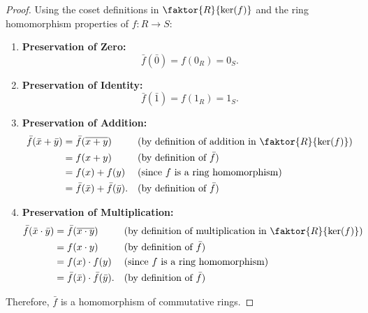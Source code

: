 \begin{proofWrapper}
\begin{content}
\begin{proof}
Using the coset definitions in $\faktor{R}{\ker(f)}$ and the ring homomorphism properties of $f \colon R \to S$:
\begin{enumerate}[label=\textbf{(\arabic*)}]
    \item \textbf{Preservation of Zero:}
    \[
    \bar{f}(\bar{0}) = f(0_R) = 0_S.
    \]
    \item \textbf{Preservation of Identity:}
    \[
    \bar{f}(\bar{1}) = f(1_R) = 1_S.
    \]
    \item \textbf{Preservation of Addition:}
    \begin{align*}
    \bar{f}(\bar{x} + \bar{y}) &= \bar{f}(\overline{x + y}) && \text{(by definition of addition in $\faktor{R}{\ker(f)}$)} \\
    &= f(x + y) && \text{(by definition of $\bar{f}$)} \\
    &= f(x) + f(y) && \text{(since $f$ is a ring homomorphism)} \\
    &= \bar{f}(\bar{x}) + \bar{f}(\bar{y}). && \text{(by definition of $\bar{f}$)}
    \end{align*}
    \item \textbf{Preservation of Multiplication:}
    \begin{align*}
    \bar{f}(\bar{x} \cdot \bar{y}) &= \bar{f}(\overline{x \cdot y}) && \text{(by definition of multiplication in $\faktor{R}{\ker(f)}$)} \\
    &= f(x \cdot y) && \text{(by definition of $\bar{f}$)} \\
    &= f(x) \cdot f(y) && \text{(since $f$ is a ring homomorphism)} \\
    &= \bar{f}(\bar{x}) \cdot \bar{f}(\bar{y}). && \text{(by definition of $\bar{f}$)}
    \end{align*}
\end{enumerate}
Therefore, $\bar{f}$ is a homomorphism of commutative rings.
\end{proof}
\end{content}

\begin{hidden}
\end{hidden}


\end{proofWrapper}
